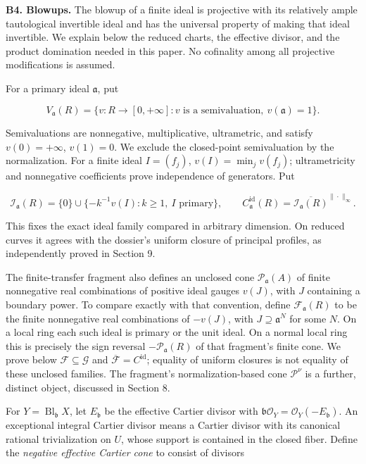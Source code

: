 \documentclass[11pt]{article}
\begin{document}
\textbf{B4. Blowups.} The blowup of a finite ideal is projective with its relatively ample tautological invertible ideal and has the universal property of making that ideal invertible. We explain below the reduced charts, the effective divisor, and the product domination needed in this paper. No cofinality among all projective modifications is assumed.

For a primary ideal \(\mathfrak a\), put

\[
V_{\mathfrak a}(R)=\{v:R\longrightarrow[0,+\infty]:v\text{ is a semivaluation},\ v(\mathfrak a)=1\}.
\]

Semivaluations are nonnegative, multiplicative, ultrametric, and satisfy \(v(0)=+\infty\), \(v(1)=0\). We exclude the closed-point semivaluation by the normalization. For a finite ideal \(I=(f_j)\), \(v(I)=\min_jv(f_j)\); ultrametricity and nonnegative coefficients prove independence of generators. Put

\[
\mathcal I_{\mathfrak a}(R)=\{0\}\cup\{-k^{-1}v(I):k\geq1,\ I\text{ primary}\},\qquad
C^{\mathrm{id}}_{\mathfrak a}(R)=\overline{\mathcal I_{\mathfrak a}(R)}^{\|\cdot\|_\infty}.
\]

This fixes the exact ideal family compared in arbitrary dimension. On reduced curves it agrees with the dossier's uniform closure of principal profiles, as independently proved in Section 9.

The finite-transfer fragment also defines an unclosed cone \(\mathcal P_{\mathfrak a}(A)\) of finite nonnegative real combinations of positive ideal gauges \(v(J)\), with \(J\) containing a boundary power. To compare exactly with that convention, define \(\mathcal F_{\mathfrak a}(R)\) to be the finite nonnegative real combinations of \(-v(J)\), with \(J\supseteq\mathfrak a^N\) for some \(N\). On a local ring each such ideal is primary or the unit ideal. On a normal local ring this is precisely the sign reversal \(-\mathcal P_{\mathfrak a}(R)\) of that fragment's finite cone. We prove below \(\mathcal F\subseteq\mathcal G\) and \(\overline{\mathcal F}=C^{\mathrm{id}}\); equality of uniform closures is not equality of these unclosed families. The fragment's normalization-based cone \(\mathcal P^{\nu}\) is a further, distinct object, discussed in Section 8.

For \(Y=\operatorname{Bl}_{\mathfrak b}X\), let \(E_{\mathfrak b}\) be the effective Cartier divisor with \(\mathfrak b\mathcal O_Y=\mathcal O_Y(-E_{\mathfrak b})\). An exceptional integral Cartier divisor means a Cartier divisor with its canonical rational trivialization on \(U\), whose support is contained in the closed fiber. Define the \emph{negative effective Cartier cone} to consist of divisors
\end{document}
